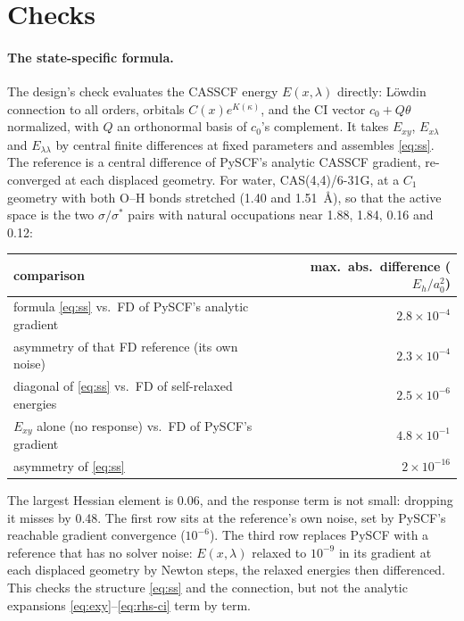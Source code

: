 \documentclass[11pt]{article}
\begin{document}
\section{Checks}
\label{sec:checks}

\paragraph{The state-specific formula.} The design's check evaluates the
CASSCF energy $E(x,\lambda)$ directly: L\"owdin connection to all orders,
orbitals $C(x)e^{K(\kappa)}$, and the CI vector $c_0 + Q\theta$
normalized, with $Q$ an orthonormal basis of $c_0$'s complement. It takes
$E_{xy}$, $E_{x\lambda}$ and $E_{\lambda\lambda}$ by central finite
differences at fixed parameters and assembles \eqref{eq:ss}. The reference
is a central difference of PySCF's analytic CASSCF gradient, re-converged
at each displaced geometry. For water, CAS(4,4)/6-31G, at a $C_1$ geometry
with both O--H bonds stretched (1.40 and 1.51~\AA), so that the active
space is the two $\sigma/\sigma^*$ pairs with natural occupations near
1.88, 1.84, 0.16 and 0.12:

\begin{center}
\begin{tabular}{@{}lr@{}}
\toprule
comparison & max.\ abs.\ difference ($E_h/a_0^2$) \\
\midrule
formula \eqref{eq:ss} vs.\ FD of PySCF's analytic gradient & $2.8\times10^{-4}$ \\
asymmetry of that FD reference (its own noise) & $2.3\times10^{-4}$ \\
diagonal of \eqref{eq:ss} vs.\ FD of self-relaxed energies & $2.5\times10^{-6}$ \\
$E_{xy}$ alone (no response) vs.\ FD of PySCF's gradient & $4.8\times10^{-1}$ \\
asymmetry of \eqref{eq:ss} & $2\times10^{-16}$ \\
\bottomrule
\end{tabular}
\end{center}

\noindent The largest Hessian element is 0.06, and the response term is
not small: dropping it misses by 0.48. The first row sits at the
reference's own noise, set by PySCF's reachable gradient convergence
($10^{-6}$). The third row replaces PySCF with a reference that has no
solver noise: $E(x,\lambda)$ relaxed to $10^{-9}$ in its gradient at each
displaced geometry by Newton steps, the relaxed energies then differenced.
This checks the structure \eqref{eq:ss} and the connection, but
not the analytic expansions \eqref{eq:exy}--\eqref{eq:rhs-ci} term by
term.
\end{document}
